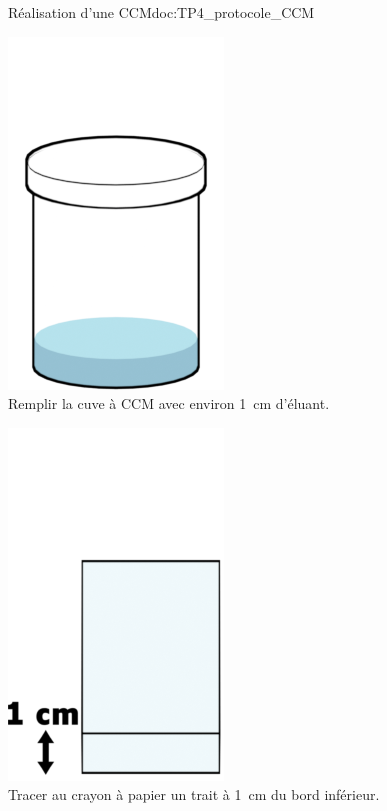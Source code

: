 \begin{doc}{Réalisation d'une CCM}{doc:TP4_protocole_CCM}
  \begin{multicols}{3}
    \begin{center}
      \includegraphics[height=0.2\textheight]{images/chimie/CCM/CCM_protocole0001.png} \\      
      Remplir la cuve à CCM avec environ \qty{1}{\cm} d'éluant.
    \end{center} 
    
    \begin{center}
      \includegraphics[height=0.2\textheight]{images/chimie/CCM/CCM_protocole0002.png} \\      
      Tracer au crayon à papier un trait à \qty{1}{\cm} du bord inférieur.
    \end{center}
  

\end{multicols}
\end{doc}
